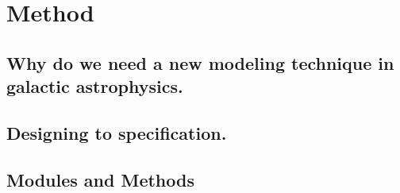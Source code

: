 
\chapter{Method} %
\label{Chapter:Method}

\section{Why do we need a new modeling technique in galactic astrophysics.}
\section{Designing to specification.}
\section{Modules and Methods}
